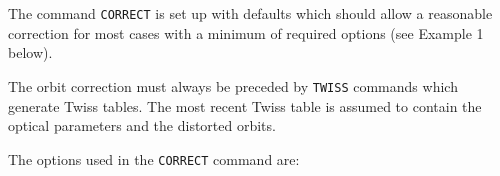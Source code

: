 

The command \texttt{CORRECT} is set up with defaults which should allow a
reasonable correction for most cases with a minimum of required options
(see Example 1 below).  

The orbit correction must always be preceded by \texttt{TWISS} commands  which
generate Twiss tables. The most recent Twiss table is assumed to contain
the optical parameters and the distorted orbits. 

The options used in the \texttt{CORRECT} command are: 

